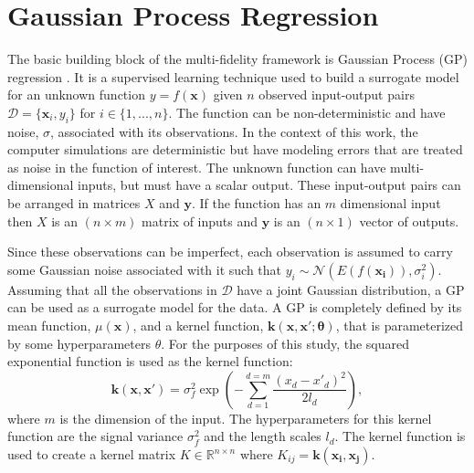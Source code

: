 \section{Gaussian Process Regression} \label{sec:gpr}
The basic building block of the multi-fidelity framework is Gaussian Process (GP) regression \cite{rasmussen_gaussian_2006}. It is a supervised learning technique used to build a surrogate model for an unknown function $y = f(\mathbf{x})$ given $n$ observed input-output pairs $\mathcal{D} = \{\mathbf{x}_i, y_i\}$ for $i \in\{1,...,n\}$. The function can be non-deterministic and have noise, $\sigma$, associated with its observations. In the context of this work, the computer simulations are deterministic but have modeling errors that are treated as noise in the function of interest. The unknown function can have multi-dimensional inputs, but must have a scalar output. These input-output pairs can be arranged in matrices $X$ and $\mathbf{y}$. If the function has an $m$ dimensional input then $X$ is an $\left (n \times m \right)$ matrix of inputs and $\mathbf{y}$ is an $\left (n \times 1 \right)$ vector of outputs.

Since these observations can be imperfect, each observation is assumed to carry some Gaussian noise associated with it such that $y_i \sim \mathcal{N}(E(f(\mathbf{x_i})),\sigma_i^2)$. Assuming that all the observations in $\mathcal{D}$ have a joint Gaussian distribution, a GP can be used as a surrogate model for the data. A GP is completely defined by its mean function, $ \mu(\mathbf{x}) $, and a kernel function, $\mathbf{k}(\mathbf{x,x';\theta})$, that is parameterized by some hyperparameters $\theta$. For the purposes of this study, the squared exponential function is used as the kernel function: 
\begin{equation}
    \mathbf{k}\left (\mathbf{x,x'} \right ) = \sigma_f^2 \exp \left ( -\sum_{d=1}^{d=m}\frac{\left ( x_d - x'_d \right )^2}{2l_d} \right ),
\end{equation}
where $m$ is the dimension of the input. The hyperparameters for this kernel function are the signal variance $\sigma_f^2$ and the length scales $l_d$. The kernel function is used to create a kernel matrix $K \in \mathbb{R} ^{ n \times n}$ where $K_{ij} = \mathbf{k \left( x_i, x_j \right )}$.

